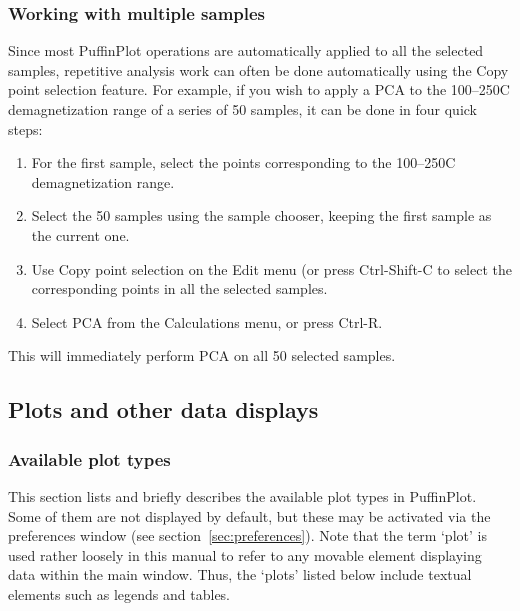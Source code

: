 \documentclass[a4paper,british]{article}
\newcommand{\ppcmd}[1]{\textsf{#1}} %
\newcommand{\caps}[1]{\MakeTextUppercase{#1}} %
\begin{document}
\subsubsection{Working with multiple samples}

Since most PuffinPlot operations are automatically applied to all the
selected samples, repetitive analysis work can often be done automatically
using the \ppcmd{Copy point selection} feature. For example, if you wish to
apply a \caps{pca} to the 100--250\textdegree{}C demagnetization range of a
series of 50 samples, it can be done in four quick steps:

\begin{enumerate}

\item For the first sample, select the points corresponding to the
  100--250\textdegree{}C demagnetization range.

\item Select the 50 samples using the sample chooser, keeping the
  first sample as the current one.

\item Use \ppcmd{Copy point selection} on the \ppcmd{Edit} menu
  (or press \ppcmd{Ctrl-Shift-C} to select the corresponding points
  in all the selected samples.

\item Select \ppcmd{\caps{pca}} from the \ppcmd{Calculations} menu,
  or press \ppcmd{Ctrl-R}.

\end{enumerate}

\noindent This will immediately perform \caps{pca} on all 50 selected
samples.

\subsection{Plots and other data displays}

\subsubsection{\label{sec:plot-types}Available plot types}

This section lists and briefly describes the available plot types in
PuffinPlot. Some of them are not displayed by default, but these may be
activated via the preferences window (see section~\ref{sec:preferences}).
Note that the term `plot' is used rather loosely in this manual to refer to
any movable element displaying data within the main window. Thus, the `plots'
listed below include textual elements such as legends and tables.
\end{document}
